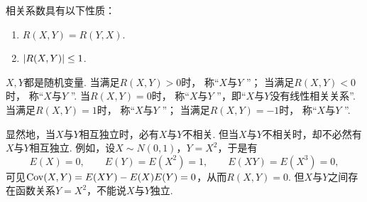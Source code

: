 \begin{property}
相关系数具有以下性质：
\begin{enumerate}
    \item \(R(X,Y)=R(Y,X)\).
    \item \(\abs{R(X,Y)} \leq 1\).
\end{enumerate}
\end{property}

\(X,Y\)都是随机变量.
当满足\(R(X,Y) > 0\)时，
称“\(X\)与\(Y\) ”；
当满足\(R(X,Y) < 0\)时，
称“\(X\)与\(Y\) ”.
当\(R(X,Y) = 0\)时，
称“\(X\)与\(Y\) ”，即“\(X\)与\(Y\)没有线性相关关系”.
当满足\(R(X,Y) = 1\)时，
称“\(X\)与\(Y\) ”；
当满足\(R(X,Y) = -1\)时，
称“\(X\)与\(Y\) ”.

显然地，当\(X\)与\(Y\)相互独立时，必有\(X\)与\(Y\)不相关.
但当\(X\)与\(Y\)不相关时，却不必然有\(X\)与\(Y\)相互独立.
例如，设\(X \sim N(0,1)\)，\(Y=X^2\)，于是有\[
    E(X) = 0,
    \qquad
    E(Y) = E(X^2) = 1,
    \qquad
    E(XY) = E(X^3) = 0,
\]
可见\(\operatorname{Cov}(X,Y) = E(XY) - E(X) E(Y) = 0\)，从而\(R(X,Y) = 0\).
但\(X\)与\(Y\)之间存在函数关系\(Y=X^2\)，不能说\(X\)与\(Y\)独立.
